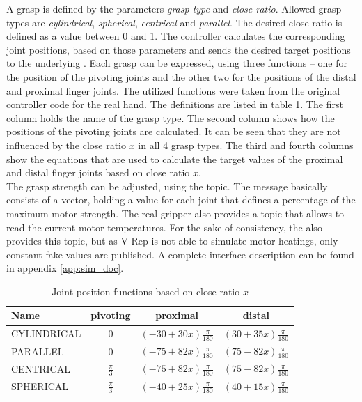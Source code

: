 A grasp is defined by the parameters \emph{grasp type} and \emph{close ratio}. Allowed grasp types are \emph{cylindrical}, \emph{spherical}, \emph{centrical} and \emph{parallel}. The desired close ratio is defined as a value between 0 and 1. The controller calculates the corresponding joint positions, based on those parameters and sends the desired target positions to the underlying . Each grasp can be expressed, using three functions -- one for the position of the pivoting joints and the other two for the positions of the distal and proximal finger joints. The utilized functions were taken from the original controller code for the real hand. The definitions are listed in table \ref{fig:grasp_defs}. The first column holds the name of the grasp type. The second column shows how the positions of the pivoting joints are calculated. It can be seen that they are not influenced by the close ratio $x$ in all 4 grasp types. The third and fourth columns show the equations that are used to calculate the target values of the proximal and distal finger joints based on close ratio $x$. \\

The grasp strength can be adjusted, using the  topic. The message basically consists of a vector, holding a value for each joint that defines a percentage of the maximum motor strength. The real gripper also provides a topic that allows to read the current motor temperatures. For the sake of consistency, the  also provides this topic, but as V-Rep is not able to simulate motor heatings, only constant fake values are published. A complete interface description can be found in appendix \ref{app:sim_doc}.

\begin{table}[h]
  \centering
  \begin{tabular}{|l|c|c|c|} \hline
	\textbf{Name} & \textbf{pivoting} & \textbf{proximal} & \textbf{distal} \\ \hline
	CYLINDRICAL & $0$ & $(-30+30x)\frac{\pi}{180}$ & $(30 + 35x)\frac{\pi}{180}$ \\
	PARALLEL & $0$ & $(-75+82x)\frac{\pi}{180}$ & $(75-82x)\frac{\pi}{180}$ \\
	CENTRICAL & $\frac{\pi}{3}$ & $(-75+82x)\frac{\pi}{180}$ & $(75-82x)\frac{\pi}{180}$ \\
	SPHERICAL & $\frac{\pi}{3}$ & $(-40+25x)\frac{\pi}{180}$ & $(40+15x)\frac{\pi}{180}$ \\ \hline
  \end{tabular}
  \caption{Joint position functions based on close ratio $x$}
  \label{fig:grasp_defs}
\end{table}

